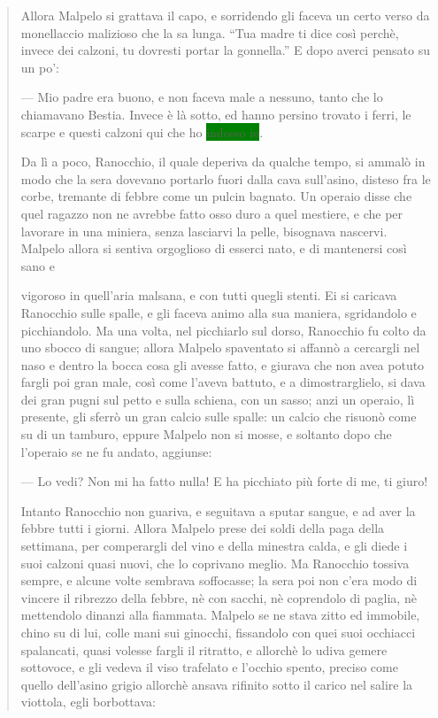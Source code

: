 \documentclass{book}
\begin{document}
\begin{quote}
 Allora Malpelo si grattava il capo, e sorridendo gli faceva un certo verso da monellaccio malizioso che la sa lunga. “Tua madre ti dice così perchè, invece dei calzoni, tu dovresti portar la gonnella.'' E dopo averci pensato su un po’:
 
 — Mio padre era buono, e non faceva male a nessuno, tanto che lo chiamavano Bestia. Invece è là sotto, ed hanno persino trovato i ferri, le scarpe e questi calzoni qui che ho \colorbox{green}{indosso io}.
 
 Da lì a poco, Ranocchio, il quale deperiva da qualche tempo, si ammalò in modo che la sera dovevano portarlo fuori dalla cava sull’asino, disteso fra le corbe, tremante di febbre come un pulcin bagnato. Un operaio disse che quel ragazzo non ne avrebbe fatto osso duro a quel mestiere, e che per lavorare in una miniera, senza lasciarvi la pelle, bisognava nascervi. Malpelo allora si sentiva orgoglioso di esserci nato, e di mantenersi così sano e 
 
 vigoroso in quell’aria malsana, e con tutti quegli stenti. Ei si caricava Ranocchio sulle spalle, e gli faceva animo alla sua maniera, sgridandolo e picchiandolo. Ma una volta, nel picchiarlo sul dorso, Ranocchio fu colto da uno sbocco di sangue; allora Malpelo spaventato si affannò a cercargli nel naso e dentro la bocca cosa gli avesse fatto, e giurava che non avea potuto fargli poi gran male, così come l’aveva battuto, e a dimostrarglielo, si dava dei gran pugni sul petto e sulla schiena, con un sasso; anzi un operaio, lì presente, gli sferrò un gran calcio sulle spalle: un calcio che risuonò come su di un tamburo, eppure Malpelo non si mosse, e soltanto dopo che l’operaio se ne fu andato, aggiunse:
 
 — Lo vedi? Non mi ha fatto nulla! E ha picchiato più forte di me, ti giuro!
 
 Intanto Ranocchio non guariva, e seguitava a sputar sangue, e ad aver la febbre tutti i giorni. Allora Malpelo prese dei soldi della paga della settimana, per comperargli del vino e della minestra calda, e gli diede i suoi calzoni quasi nuovi, che lo coprivano meglio. Ma Ranocchio tossiva sempre, e alcune volte sembrava soffocasse; la sera poi non c’era modo di vincere il ribrezzo della febbre, nè con sacchi, nè coprendolo di paglia, nè mettendolo dinanzi alla fiammata. Malpelo se ne stava zitto ed immobile, chino su di lui, colle mani sui ginocchi, fissandolo con quei suoi occhiacci spalancati, quasi volesse fargli il ritratto, e allorchè lo udiva gemere sottovoce, e gli vedeva il viso trafelato e l’occhio spento, preciso come quello dell’asino grigio allorchè ansava rifinito sotto il carico nel salire la viottola, egli borbottava:
 

\end{quote}
\end{document}
